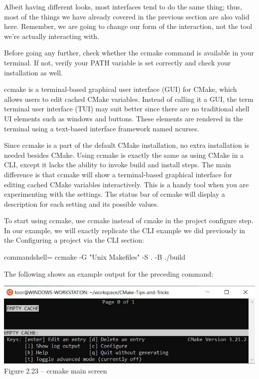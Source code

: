 
Albeit having different looks, most interfaces tend to do the same thing; thus, most of the things we have already covered in the previous section are also valid here. Remember, we are going to change our form of the interaction, not the tool we're actually interacting with.

\begin{tcolorbox}[colback=webgreen!5!white,colframe=webgreen!75!black,title=Note]
Before going any further, check whether the ccmake command is available in your terminal. If not, verify your PATH variable is set correctly and check your installation as well.
\end{tcolorbox}


ccmake is a terminal-based graphical user interface (GUI) for CMake, which allows users to edit cached CMake variables. Instead of calling it a GUI, the term terminal user interface (TUI) may suit better since there are no traditional shell UI elements such as windows and buttons. These elements are rendered in the terminal using a text-based interface framework named ncurses.

Since ccmake is a part of the default CMake installation, no extra installation is needed besides CMake. Using ccmake is exactly the same as using CMake in a CLI, except it lacks the ability to invoke build and install steps. The main difference is that ccmake will show a terminal-based graphical interface for editing cached CMake variables interactively. This is a handy tool when you are experimenting with the settings. The status bar of ccmake will display a description for each setting and its possible values.

To start using ccmake, use ccmake instead of cmake in the project configure step. In our example, we will exactly replicate the CLI example we did previously in the Configuring a project via the CLI section:

\begin{tcblisting}{commandshell={}}
ccmake -G "Unix Makefiles" -S . -B ./build
\end{tcblisting}

The following shows an example output for the preceding command:

\begin{center}
\includegraphics[width=1.\textwidth]{content/1/chapter2/images/23.jpg}\\
Figure 2.23 – ccmake main screen
\end{center}

